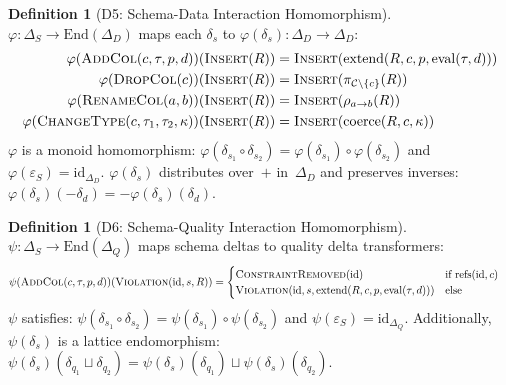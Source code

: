 \documentclass[11pt,a4paper]{article}
\theoremstyle{definition}
\newtheorem{definition}[theorem]{Definition}
\newcommand{\DeltaS}{\Delta_{\!S}}
\newcommand{\DeltaD}{\Delta_{\!D}}
\newcommand{\DeltaQ}{\Delta_{\!Q}}
\newcommand{\epsS}{\varepsilon_S}
\begin{document}
\begin{definition}[D5: Schema-Data Interaction Homomorphism]\label{def:phi}
$\varphi\colon \DeltaS \to \mathrm{End}(\DeltaD)$ maps each $\delta_s$ to
$\varphi(\delta_s)\colon \DeltaD \to \DeltaD$:
\begin{align*}
\varphi(\textsc{AddCol}(c,\tau,p,d))(\textsc{Insert}(R))
  &= \textsc{Insert}(\mathrm{extend}(R, c, p, \mathrm{eval}(\tau, d))) \\
\varphi(\textsc{DropCol}(c))(\textsc{Insert}(R))
  &= \textsc{Insert}(\pi_{\mathcal{C}\setminus\{c\}}(R)) \\
\varphi(\textsc{RenameCol}(a, b))(\textsc{Insert}(R))
  &= \textsc{Insert}(\rho_{a \to b}(R)) \\
\varphi(\textsc{ChangeType}(c,\tau_1,\tau_2,\kappa))(\textsc{Insert}(R))
  &= \textsc{Insert}(\mathrm{coerce}(R, c, \kappa))
\end{align*}
$\varphi$ is a monoid homomorphism: $\varphi(\delta_{s_1} \circ \delta_{s_2}) =
\varphi(\delta_{s_1}) \circ \varphi(\delta_{s_2})$ and
$\varphi(\epsS) = \mathrm{id}_{\DeltaD}$.
$\varphi(\delta_s)$ distributes over~$+$ in~$\DeltaD$ and preserves inverses:
$\varphi(\delta_s)(-\delta_d) = -\varphi(\delta_s)(\delta_d)$.
\end{definition}

\begin{definition}[D6: Schema-Quality Interaction Homomorphism]\label{def:psi}
$\psi\colon \DeltaS \to \mathrm{End}(\DeltaQ)$ maps schema deltas to quality
delta transformers:
\begin{align*}
\psi(\textsc{AddCol}(c,\tau,p,d))(\textsc{Violation}(\mathrm{id}, s, R))
  &= \begin{cases}
    \textsc{ConstraintRemoved}(\mathrm{id}) & \text{if } \mathrm{refs}(\mathrm{id}, c) \\
    \textsc{Violation}(\mathrm{id}, s, \mathrm{extend}(R, c, p, \mathrm{eval}(\tau,d))) & \text{else}
  \end{cases}
\end{align*}
$\psi$ satisfies: $\psi(\delta_{s_1} \circ \delta_{s_2}) =
\psi(\delta_{s_1}) \circ \psi(\delta_{s_2})$ and $\psi(\epsS) = \mathrm{id}_{\DeltaQ}$.
Additionally, $\psi(\delta_s)$ is a lattice endomorphism:
$\psi(\delta_s)(\delta_{q_1} \sqcup \delta_{q_2}) =
\psi(\delta_s)(\delta_{q_1}) \sqcup \psi(\delta_s)(\delta_{q_2})$.
\end{definition}
\end{document}
